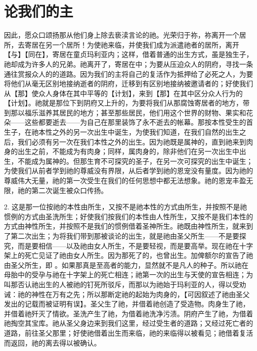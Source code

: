 
\chapter{论我们的主}


因此，愿众口颂扬那从他们身上除去亵渎言论的祂。光荣归于祢，祢离开一个居所，去寄居在另一个居所！为使祂来临，并使我们成为派遣祂者的居所，离开【与】【同在】，寄居在童贞玛利亚内；这样，借着普通的出生方式，虽是独生子，祂却成为许多人的兄弟。祂离开了，寄居在中；为要从压迫众人的阴府，寻找一条通往赏报众人的的道路。因为我们的主将自己的复活作为抵押给了必死之人，为要将他们从毫无区别地接纳逝者的阴府，迁移到有区别地接纳被邀请者的；好使我们从【那】使众人身体在其中平等的【计划】，来到【那】在其中区分众人行为的【计划】。祂就是那位下到阴府又上升的，为要将我们从那腐蚀寄居者的地方，带到那以福乐滋养其居民的地方；甚至那些居民，他们用这个世界的财物、果实和花朵——这些都要逝去——为自己在那里装饰了永不逝去的帐幕。那按本性受生的首生子，在祂本性之外的另一次出生中诞生，为使我们知道，在我们自然的出生之后，我们必须有另一次在我们本性之外的出生。因为祂既是属神的，直到祂来到肉身的出生之前，不能成为有肉身；同样，属肉身的，除非他们在另一次出生中出生，不能成为属神的。但那生育不可探究的圣子，在另一次可探究的出生中诞生；为使我们从前者学到祂的尊威没有界限，从后者学到祂的恩宠没有量度。因为祂的尊威伟大无量，祂的第一次受生在我们的任何思想中都无法想象。祂的恩宠丰盈无限，祂的第二次诞生被众口传扬。\par

2. 这是那一位按祂的本性由所生，又按不是祂本性的方式由所生，并按照不是祂惯例的方式由圣洗所生；好使我们按我们的本性由人性所生，又按不是我们本性的方式由神性所生，并按照不是我们的惯例借着圣神所生。祂既由神性所生，就来到了第二次出生；为将我们带到那被谈论的出生，就是祂由圣父所生——不是要探究，而是要相信——以及祂由女人所生，不是要轻视，而是要高举。现在祂在十字架上的死亡见证了祂由女人所生。因为那死了的，也曾出生。加俾额尔的宣告了祂由圣父所生，即 。如果那真是至高者的能力，显然就不是凡人的种子。所以祂在母胎中的受孕与祂在十字架上的死亡相连；祂第一次的出生与天使的宣告相连；为叫那否认祂出生的人被祂的钉死所驳斥，而那以为祂始于玛利亚的人，得以受劝诫：祂的神性在万有之先；所以那断定祂的起始为肉身的，【可因叙述了祂由圣父发出的记载而被证明有误】。圣父生了祂，并借着祂创造了受造物。肉身生了祂，并借着祂歼灭了情欲。圣洗产生了祂，为借着祂洗净污渍。阴府产生了祂，为借着祂掏空其宝库。祂从圣父身边来到我们这里，经过受生者的道路；又经过死亡者的道路，前往圣父那里；好使祂借着出生而来临，祂的来临得以被看见；祂借着复活而返回，祂的离去得以被确认。\par


